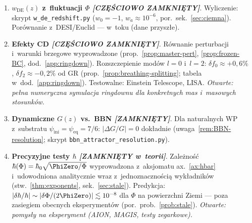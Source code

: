 \begin{enumerate}[label=\textbf{O\arabic*}., start=5, nosep]
  \item \textbf{$w_{\mathrm{DE}}(z)$ z~fluktuacji $\Phi$
        \emph{[CZ\k{E}\'SCIOWO ZAMKNI\k{E}TY]}}.
        Wyliczenie: skrypt \texttt{w\_de\_redshift.py} ($w_0 = -1$,
        $w_a \approx 10^{-6}$, por.\ sek.~\ref{sec:ciemna}).
        Por\'ownanie z~DESI/Euclid --- w~toku (dane przysz\l{}e).

  \item \textbf{Efekty CD
        \emph{[CZ\k{E}\'SCIOWO ZAMKNI\k{E}TY]}}.
        R\'ownanie perturbacji i~warunki brzegowe wyprowadzone
        (prop.~\ref{prop:master-pert}, \ref{prop:frozen-BC},
        dod.~\ref{app:ringdown}).
        Rozszczepienie mod\'ow $l{=}0$ i~$l{=}2$:
        $\delta f_0 \approx +0{,}6\%$, $\delta f_2 \approx -0{,}2\%$
        od GR (prop.~\ref{prop:breathing-splitting}; tabela w~dod.~\ref{app:ringdown}).
        Testowalne: Einstein Telescope, LISA.
        \emph{Otwarte: pe\l{}na numeryczna symulacja ringdownu dla
        konkretnych mas i~masowych stosunk\'ow.}

  \item \textbf{Dynamiczne $G(z)$ vs.\ BBN
        \emph{[ZAMKNI\k{E}TY]}}.
        Dla naturalnych WP z~substratu $\psi_{\mathrm{ini}}
        = \psi_{\mathrm{eq}} = 7/6$: $|\Delta G/G| = 0$ dok\l{}adnie
        (uwaga~\ref{rem:BBN-resolution}; skrypt
        \texttt{bbn\_attractor\_resolution.py}).

  \item \textbf{Precyzyjne testy $\hbar$
        \emph{[ZAMKNI\k{E}TY w~teorii]}}.
        Zale\.zno\'s\'c $\hbar(\Phi) = \hbar_0 \sqrt{\PhiZero/\Phi}$
        wyprowadzona z~aksjomatu ax.~\ref{ax:hbar} i~udowodniona
        analitycznie wraz z~jednoznaczno\'sci\k{a} wyk\l{}adnik\'ow
        (stw.~\ref{thm:exponents}, sek.~\ref{sec:stale}).
        Predykcja: $|\delta\hbar/\hbar| \sim
        |\delta\Phi/(2\PhiZero)| \lesssim 10^{-8}$
        dla $\Phi$ na powierzchni Ziemi --- poza zasiegiem
        obecnych eksperyment\'ow (por.\ prob.~\ref{prob:stale}).
        \emph{Otwarte: pomys\l{}y na eksperyment
        (AION, MAGIS, testy zegarkowe).}
\end{enumerate}


